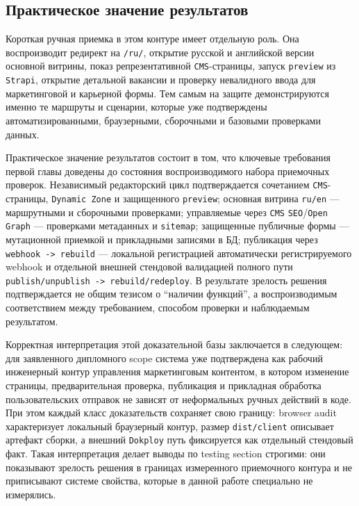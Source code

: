 \subsection{Практическое значение результатов}

Короткая ручная приемка в этом контуре имеет отдельную роль. Она воспроизводит
редирект на \texttt{/ru/}, открытие русской и английской версии основной витрины, показ
репрезентативной \texttt{CMS}-страницы, запуск \texttt{preview} из \texttt{Strapi},
открытие детальной вакансии и проверку невалидного ввода для маркетинговой и карьерной
формы. Тем самым на защите демонстрируются именно те маршруты и сценарии, которые уже
подтверждены автоматизированными, браузерными, сборочными и базовыми проверками данных.

Практическое значение результатов состоит в том, что ключевые требования первой главы
доведены до состояния воспроизводимого набора приемочных проверок. Независимый редакторский цикл
подтверждается сочетанием \texttt{CMS}-страницы, \texttt{Dynamic Zone} и защищенного
\texttt{preview}; основная витрина \texttt{ru/en} --- маршрутными и сборочными проверками;
управляемые через \texttt{CMS} \texttt{SEO}/\texttt{Open Graph} --- проверками метаданных и
\texttt{sitemap}; защищенные публичные формы --- мутационной приемкой и прикладными
записями в БД; публикация через \texttt{webhook -> rebuild} --- локальной регистрацией
автоматически регистрируемого webhook и отдельной внешней стендовой валидацией полного пути
\texttt{publish/unpublish -> rebuild/redeploy}. В результате зрелость решения
подтверждается не общим тезисом о ``наличии функций'', а воспроизводимым соответствием
между требованием, способом проверки и наблюдаемым результатом.

Корректная интерпретация этой доказательной базы заключается в следующем: для
заявленного дипломного scope система уже подтверждена как рабочий инженерный контур
управления маркетинговым контентом, в котором изменение страницы, предварительная
проверка, публикация и прикладная обработка пользовательских отправок не зависят от
неформальных ручных действий в коде. При этом каждый класс доказательств сохраняет свою
границу: browser audit характеризует локальный браузерный контур, размер
\texttt{dist/client} описывает артефакт сборки, а внешний \texttt{Dokploy} путь
фиксируется как отдельный стендовый факт. Такая интерпретация делает выводы по testing
section строгими: они показывают зрелость решения в границах измеренного приемочного
контура и не приписывают системе свойства, которые в данной работе специально не
измерялись.

